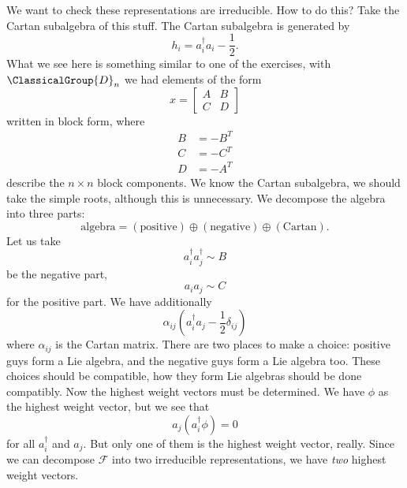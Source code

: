 We want to check these representations are irreducible. How to do
this? Take the Cartan subalgebra of this stuff. The Cartan
subalgebra is generated by
\begin{equation}
h_{i}=a^{\dagger}_{i}a_{i}-\frac{1}{2}.
\end{equation}
What we see here is something similar to one of the exercises,
with $\ClassicalGroup{D}_{n}$ we had elements of the form
\begin{equation}
x = \begin{bmatrix}A & B \\ C & D
\end{bmatrix}
\end{equation}
written in block form, where
\begin{subequations}
\begin{align}
B &= -B^{T}\\
C &= -C^{T}\\
D &= -A^{T}
\end{align}
\end{subequations}
describe the $n\times n$ block components. We know the Cartan
subalgebra, we should take the simple roots, although this is
unnecessary. We decompose the algebra into three parts:
\begin{equation}
\mbox{algebra} = (\mbox{positive})\oplus(\mbox{negative})\oplus(\mbox{Cartan}).
\end{equation}
Let us take
\begin{equation}
a^{\dagger}_{i}a^{\dagger}_{j}\sim B
\end{equation}
be the negative part,
\begin{equation}
a_{i}a_{j}\sim C
\end{equation}
for the positive part. We have additionally
\begin{equation}
\alpha_{ij}(a^{\dagger}_{i}a_{j}-\frac{1}{2}\delta_{ij})
\end{equation}
where $\alpha_{ij}$ is the Cartan matrix. There are two places to
make a choice: positive guys form a Lie algebra, and the negative
guys form a Lie algebra too. These choices should be compatible,
how they form Lie algebras should be done compatibly. Now the
highest weight vectors must be determined. We have $\phi$ as the
highest weight vector, but we see that
\begin{equation}
a_{j}(a^{\dagger}_{i}\phi) = 0
\end{equation}
for all $a^{\dagger}_{i}$ and $a_{j}$. But only one of them is
the highest weight vector, really. Since we can decompose
$\mathcal{F}$ into two irreducible representations, we have
\emph{two} highest weight vectors.

